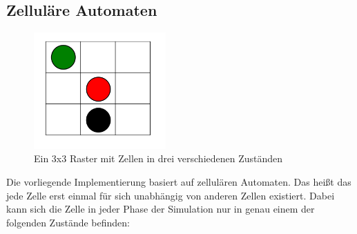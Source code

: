 \subsection*{Zelluläre Automaten}
\begin{figure}[t]
	\centering
	\includegraphics[width= 0.45\textwidth]{./images/nachbarn.png}
	\caption{Ein 3x3 Raster mit Zellen in drei verschiedenen Zuständen}
	\label{fig:Raster}
\end{figure}
Die vorliegende Implementierung basiert auf zellulären Automaten. Das heißt das jede Zelle erst einmal für sich unabhängig von anderen Zellen existiert. %
Dabei kann sich die Zelle in jeder Phase der Simulation nur in genau einem der folgenden Zustände befinden:
